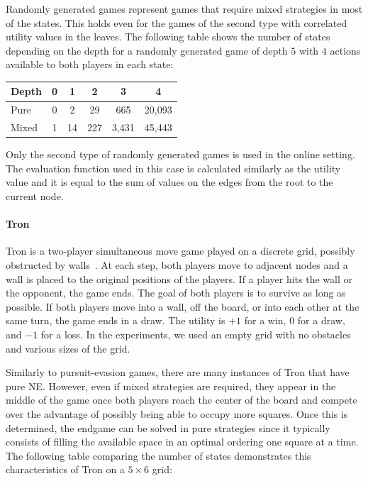 Randomly generated games represent games that require mixed strategies in most of the states.
This holds even for the games of the second type with correlated utility values in the leaves.
The following table shows the number of states depending on the depth for a randomly generated game of depth $5$ with $4$ actions available to both players in each state:

\vspace{0.1cm}

\begin{center}
\small
\begin{tabular}{|l|c|c|c|c|c|}
\hline Depth & 0 & 1 & 2 & 3 & 4 \\
\hline Pure  & 0 & 2 & 29 & 665 & 20,093 \\
\hline Mixed & 1 & 14 & 227 & 3,431 & 45,443 \\
\hline
\end{tabular}
\end{center}

\vspace{0.1cm}

Only the second type of randomly generated games is used in the online setting.
The evaluation function used in this case is calculated similarly as the utility value and it is equal to the sum of values on the edges from the root to the current node.

\paragraph{\textbf{Tron}}
Tron is a two-player simultaneous move game played on a discrete grid, possibly obstructed by
walls~\cite{Samothrakis10Tron,Perick12Comparison,Lanctot13Tron}.
At each step, both players move to adjacent nodes and a wall is placed to the original positions of the players.
If a player hits the wall or the opponent, the game ends.
The goal of both players is to survive as long as possible.
If both players move into a wall, off the board, or into each other at the same turn, the game ends in a draw.
The utility is $+1$ for a win, $0$ for a draw, and $-1$ for a loss.
In the experiments, we used an empty grid with no obstacles and various sizes of the grid.

Similarly to pursuit-evasion games, there are many instances of Tron that have pure NE.
However, even if mixed strategies are required, they appear in the middle of the game once both players reach the center of the board and compete over the advantage of possibly being able to occupy more squares.
Once this is determined, the endgame can be solved in pure strategies since it typically consists of filling the available space in an optimal ordering one square at a time.
The following table comparing the number of states demonstrates this characteristics of Tron on a $5\times6$ grid:

